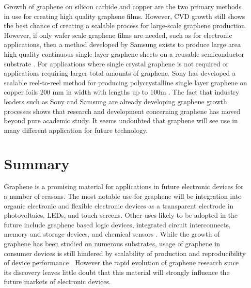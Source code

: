 Growth of graphene on silicon carbide and copper are the two primary methods in use for creating high quality graphene films. However, CVD growth still shows the best chance of creating a scalable process for large-scale graphene production. However, if only wafer scale graphene films are needed, such as for electronic applications, then a method developed by Samsung exists to produce large area high quality continuous single layer graphene sheets on a reusable semiconductor substrate \cite{ samsung-graphene}. For applications where single crystal graphene is not required or applications requiring larger total amounts of graphene, Sony has developed a scalable reel-to-reel method for producing polycrystalline single layer graphene on copper foils 200 mm in width with lengths up to 100m \cite{ sony-graphene}. The fact that industry leaders such as Sony and Samsung are already developing graphene growth processes shows that research and development concerning graphene has moved beyond pure academic study. It seems undoubted that graphene will see use in many different application for future technology.

\section{Summary}
Graphene is a promising material for applications in future electronic devices for a number of reasons. The most notable use for graphene will be integration into organic electronic and flexible electronic devices as a transparent electrode in photovoltaics, LEDs, and touch screens. Other uses likely to be adopted in the future include graphene based logic devices, integrated circuit interconnects, memory and storage devices, and chemical sensors \cite{ Wolf-apps}. While the growth of graphene has been studied on numerous substrates, usage of graphene in consumer devices is still hindered by scalability of production and reproducibility of device performance \cite{ graphene-synth-app}. However the rapid evolution of graphene research since its discovery leaves little doubt that this material will strongly influence the future markets of electronic devices.
